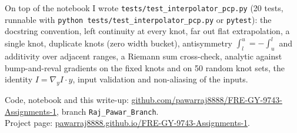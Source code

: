 \documentclass[11pt]{article}
\newcommand{\code}[1]{\texttt{#1}}
\begin{document}
On top of the notebook I wrote \code{tests/test\_interpolator\_pcp.py} (20 tests, runnable with
\code{python tests/test\_interpolator\_pcp.py} or \code{pytest}): the docstring convention, left continuity at every knot, far out
flat extrapolation, a single knot, duplicate knots (zero width bucket), antisymmetry $\int_l^u = -\int_u^l$ and additivity over
adjacent ranges, a Riemann sum cross-check, analytic against bump-and-reval gradients on the fixed knots and on 50 random knot sets,
the identity $I = \nabla_y I \cdot y$, input validation and non-aliasing of the inputs.

\vspace{1em}
\noindent Code, notebook and this write-up: \href{https://github.com/pawarraj8888/FRE-GY-9743-Assignments-1/tree/Raj_Pawar_Branch}{github.com/pawarraj8888/FRE-GY-9743-Assignments-1}, branch \code{Raj\_Pawar\_Branch}.\\
Project page: \href{https://pawarraj8888.github.io/FRE-GY-9743-Assignments-1/}{pawarraj8888.github.io/FRE-GY-9743-Assignments-1}.
\end{document}
